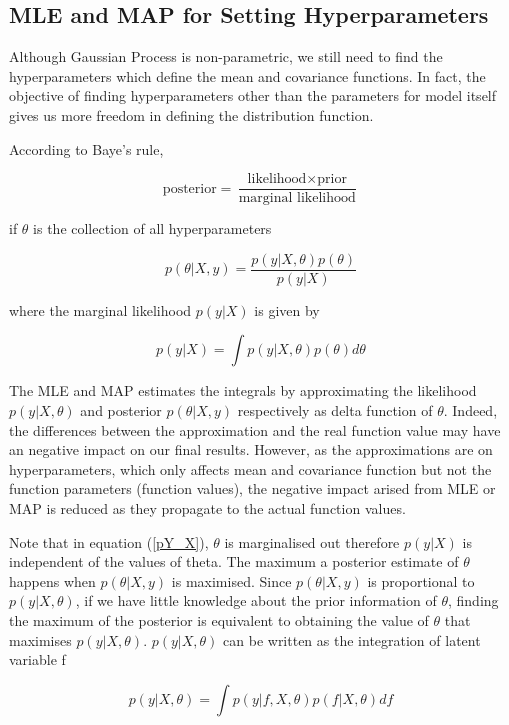 \documentclass[14pt]{report}
\numberwithin{equation}{chapter}
\begin{document}
\begin{spacing}{2}
\subsection{MLE and MAP for Setting Hyperparameters}
Although Gaussian Process is non-parametric, we still need to find the hyperparameters which define the mean and covariance functions. In fact, the objective of finding hyperparameters other than the parameters for model itself gives us more freedom in defining the distribution function. 

According to Baye's rule,

\[\mbox{posterior} = \frac{\mbox{likelihood}\times \mbox{prior}}{\mbox{marginal likelihood}}\]

if $\theta$ is the collection of all hyperparameters

\[p(\theta|X,y) = \frac{p(y|X,\theta)p(\theta)}{p(y|X)}\]

where the marginal likelihood $p(y|X)$ is given by 

\begin{equation}
\label{pY_X}
p(y|X) = \int{p(y|X,\theta)p(\theta)}d\theta
\end{equation}

The MLE and MAP estimates the integrals by approximating the likelihood $p(y|X,\theta)$ and posterior $p(\theta|X,y)$ respectively as delta function of $\theta$. Indeed, the differences between the approximation and the real function value may have an negative impact on our final results. However, as the approximations are on hyperparameters, which only affects mean and covariance function but not the function parameters (function values), the negative impact arised from MLE or MAP is reduced as they propagate to the actual function values.

Note that in equation (\ref{pY_X}), $\theta$ is marginalised out therefore $p(y|X)$ is independent of the values of theta. The maximum a posterior estimate of $\theta$ happens when $p(\theta|X,y)$ is maximised. Since $p(\theta|X,y)$ is proportional to $p(y|X,\theta)$, if we have little knowledge about the prior information of $\theta$, finding the maximum of the posterior is equivalent to obtaining the value of $\theta$ that maximises $p(y|X,\theta)$. $p(y|X,\theta)$ can be written as the integration of latent variable f

\begin{equation}
\label{theta_likelihood}
p(y|X,\theta) = \int{p(y|f,X,\theta)p(f|X,\theta)}df
\end{equation}


\end{spacing}
\end{document}
